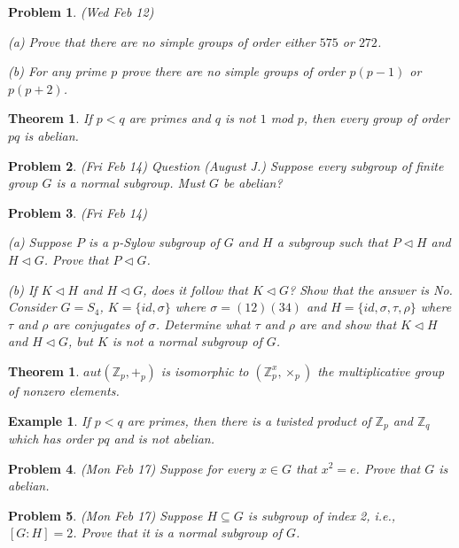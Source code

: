 \documentclass[12pt]{article}
\def\si{\sigma}
\def\zz{{\mathbb Z}}
\def\si{\sigma}
\def\su{\subseteq}
\def\normal{\triangleleft}
\newtheorem{thm}[theorem]{Theorem}
\newtheorem{examp}[theorem]{Example}
\newtheorem{prob}{Problem}
\begin{document}
\begin{prob}(Wed Feb 12)
\par (a) Prove that there are no simple groups of order
either $575$ or $272$.
\par (b) For any prime $p$ prove there are no simple groups
of order $p(p-1)$ or $p(p+2)$.
\end{prob}

\begin{thm}
If $p<q$ are primes and $q$ is not $1$ mod $p$, then every
group of order $pq$ is abelian.
\end{thm}

\begin{prob}
(Fri Feb 14) Question (August J.) Suppose every subgroup
of finite group $G$ is a normal subgroup.  Must $G$ be abelian?
\end{prob}

\begin{prob}
(Fri Feb 14)
\par (a) Suppose $P$ is a $p$-Sylow subgroup of $G$ and
$H$ a subgroup such that $P\normal H$ and $H\normal G$.
Prove that $P\normal G$.
\par (b) If $K\normal H$ and $H\normal G$, does it follow
that $K\normal G$?  Show that the answer is No.
Consider $G=S_4$, $K=\{id,\si\}$ where $\si=(12)(34)$ and
$H=\{id,\si,\tau,\rho\}$ where $\tau$ and $\rho$ are conjugates
of $\si$.  Determine what $\tau$ and $\rho$ are and show
that $K\normal H$ and $H\normal G$, but $K$ is not a normal subgroup
of  $G$.
\end{prob}

\begin{thm}
$aut(\zz_p,+_p)$ is isomorphic to $(\zz_p^{x},\times_p)$ the multiplicative group
of nonzero elements.
\end{thm}

\begin{examp}
If $p<q$ are primes, then there is a twisted product of
$\zz_p$ and $\zz_q$ which has order $pq$ and is not abelian.
\end{examp}

\begin{prob}
(Mon Feb 17) Suppose for every $x\in G$ that $x^2=e$.  Prove
that $G$ is abelian.
\end{prob}

\begin{prob}
(Mon Feb 17) Suppose $H\su G$ is subgroup of index 2, i.e., 
$[G:H]=2$.  Prove that it is a normal subgroup of $G$.
\end{prob}
\end{document}
